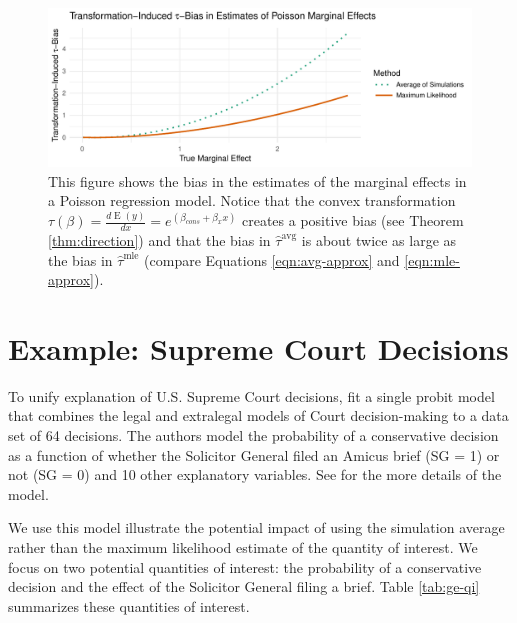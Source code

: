 \documentclass[11pt]{article}
\DeclareMathOperator*{\E}{\text{E}}
\begin{document}
\begin{figure}[h!]
\begin{center}
\includegraphics[scale = 0.65]{figs/poisson-mcs.pdf}
\vspace{.1in}
\caption{This figure shows the bias in the estimates of the marginal effects in a Poisson regression model. Notice that the convex transformation $\tau(\beta) = \frac{d \E (y)}{dx} = e^{(\beta_{cons} + \beta_x x)}$ creates a positive bias (see Theorem \ref{thm:direction}) and that the bias in $\hat{\tau}^\text{avg}$ is about twice as large as the bias in $\hat{\tau}^\text{mle}$ (compare Equations \ref{eqn:avg-approx} and \ref{eqn:mle-approx}).}\label{fig:poisson-mcs}
\end{center}
\end{figure}

\section*{Example: Supreme Court Decisions}

To unify explanation of U.S. Supreme Court decisions, \cite{GeorgeEpstein1992} fit a single probit model that combines the legal and extralegal models of Court decision-making to a data set of 64 decisions.
The authors model the probability of a conservative decision as a function of whether the Solicitor General filed an Amicus brief (SG = 1) or not (SG = 0) and 10 other explanatory variables.
See \cite{GeorgeEpstein1992} for the more details of the model.

We use this model illustrate the potential impact of using the simulation average rather than the maximum likelihood estimate of the quantity of interest.
We focus on two potential quantities of interest: the probability of a conservative decision and the effect of the Solicitor General filing a brief.
Table \ref{tab:ge-qi} summarizes these quantities of interest.
\end{document}
